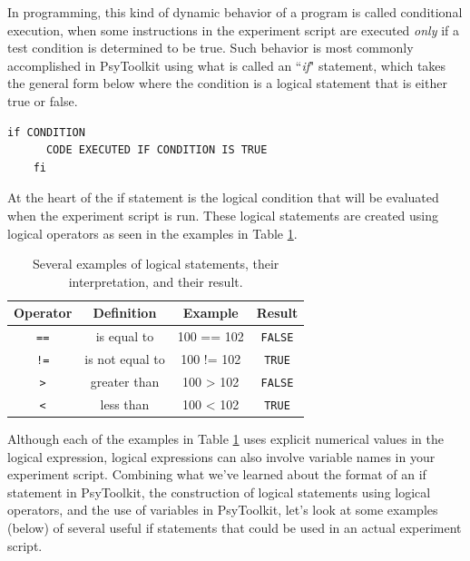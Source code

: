 In programming, this kind of dynamic behavior of a program is called \gls{conditional execution}, when some instructions in the experiment script are executed \emph{only} if a test condition is determined to be true.  Such behavior is most commonly accomplished in PsyToolkit using what is called an ``\emph{if}" statement, which takes the general form below where the condition is a logical statement that is either true or false.

\begin{Verbatim}[xleftmargin=1.5in]
    if CONDITION
      CODE EXECUTED IF CONDITION IS TRUE
    fi
\end{Verbatim}

At the heart of the if statement is the logical condition that will be evaluated when the experiment script is run.  These logical statements are created using logical operators as seen in the examples in Table \ref{tab:logic}.
\begin{center}
\begin{table}[h]
\begin{tabular}{ c c c c}
    \textbf{Operator} &  \textbf{Definition} & \textbf{Example} & \textbf{Result}\\
    \hline
    \hline
    \texttt{==} & is equal to & 100 == 102 & \texttt{FALSE}\\
    \texttt{!=} & is not equal to & 100 != 102 & \texttt{TRUE}\\
    \texttt{>} & greater than & 100 > 102 & \texttt{FALSE}\\
    \texttt{<} & less than & 100 < 102 & \texttt{TRUE}\\
\end{tabular}
\caption{\label{tab:logic}Several examples of logical statements, their interpretation, and their result.}
\end{table}
\end{center}

Although each of the examples in Table \ref{tab:logic} uses explicit numerical values in the logical expression, logical expressions can also involve variable names in your experiment script.  Combining what we've learned about the format of an if statement in PsyToolkit, the construction of logical statements using logical operators, and the use of variables in PsyToolkit, let's look at some examples (below) of several useful if statements that could be used in an actual experiment script.

